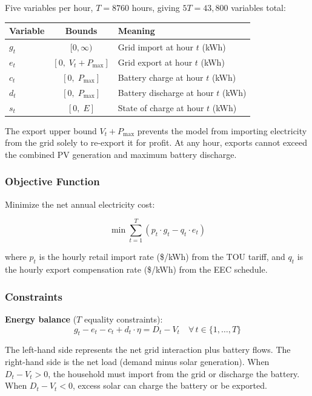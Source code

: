\documentclass[11pt]{article}
\begin{document}
Five variables per hour, $T = 8760$ hours, giving $5T = 43{,}800$ variables total:

\begin{table}[htbp]
\centering
\begin{tabular}{l c l}
\toprule
\textbf{Variable} & \textbf{Bounds} & \textbf{Meaning} \\
\midrule
$g_t$ & $[0, \infty)$ & Grid import at hour $t$ (kWh) \\
$e_t$ & $[0,\; V_t + P_{\max}]$ & Grid export at hour $t$ (kWh) \\
$c_t$ & $[0,\; P_{\max}]$ & Battery charge at hour $t$ (kWh) \\
$d_t$ & $[0,\; P_{\max}]$ & Battery discharge at hour $t$ (kWh) \\
$s_t$ & $[0,\; E]$ & State of charge at hour $t$ (kWh) \\
\bottomrule
\end{tabular}
\end{table}

The export upper bound $V_t + P_{\max}$ prevents the model from importing electricity from the grid solely to re-export it for profit. At any hour, exports cannot exceed the combined PV generation and maximum battery discharge.

\subsubsection{Objective Function}

Minimize the net annual electricity cost:

\begin{equation}
    \min \sum_{t=1}^{T} \left( p_t \cdot g_t - q_t \cdot e_t \right)
\end{equation}

where $p_t$ is the hourly retail import rate (\$/kWh) from the TOU tariff, and $q_t$ is the hourly export compensation rate (\$/kWh) from the EEC schedule.

\subsubsection{Constraints}

\textbf{Energy balance} ($T$ equality constraints):
\begin{equation}
    g_t - e_t - c_t + d_t \cdot \eta = D_t - V_t \quad \forall \, t \in \{1, \ldots, T\}
\end{equation}

The left-hand side represents the net grid interaction plus battery flows. The right-hand side is the net load (demand minus solar generation). When $D_t - V_t > 0$, the household must import from the grid or discharge the battery. When $D_t - V_t < 0$, excess solar can charge the battery or be exported.
\end{document}
